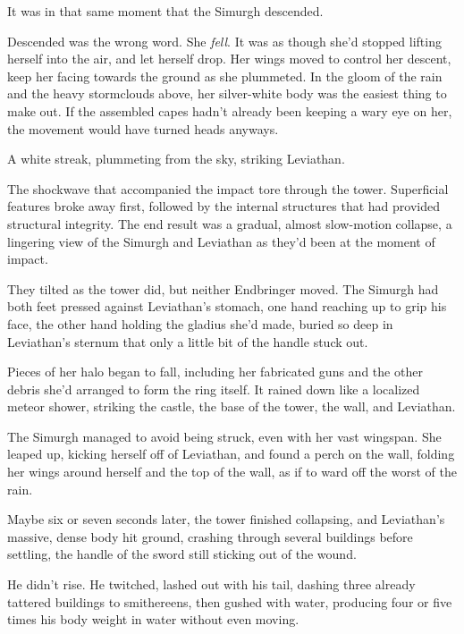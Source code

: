 It was in that same moment that the Simurgh descended.



Descended was the wrong word.  She \emph{fell}.  It was as though she'd stopped lifting herself into the air, and let herself drop.  Her wings moved to control her descent, keep her facing towards the ground as she plummeted.  In the gloom of the rain and the heavy stormclouds above, her silver-white body was the easiest thing to make out.  If the assembled capes hadn't already been keeping a wary eye on her, the movement would have turned heads anyways.



A white streak, plummeting from the sky, striking Leviathan.



The shockwave that accompanied the impact tore through the tower.  Superficial features broke away first, followed by the internal structures that had provided structural integrity.  The end result was a gradual, almost slow-motion collapse, a lingering view of the Simurgh and Leviathan as they'd been at the moment of impact.



They tilted as the tower did, but neither Endbringer moved.  The Simurgh had both feet pressed against Leviathan's stomach, one hand reaching up to grip his face, the other hand holding the gladius she'd made, buried so deep in Leviathan's sternum that only a little bit of the handle stuck out.



Pieces of her halo began to fall, including her fabricated guns and the other debris she'd arranged to form the ring itself.  It rained down like a localized meteor shower, striking the castle, the base of the tower, the wall, and Leviathan.



The Simurgh managed to avoid being struck, even with her vast wingspan.  She leaped up, kicking herself off of Leviathan, and found a perch on the wall, folding her wings around herself and the top of the wall, as if to ward off the worst of the rain.



Maybe six or seven seconds later, the tower finished collapsing, and Leviathan's massive, dense body hit ground, crashing through several buildings before settling, the handle of the sword still sticking out of the wound.



He didn't rise.  He twitched, lashed out with his tail, dashing three already tattered buildings to smithereens, then gushed with water, producing four or five times his body weight in water without even moving.



